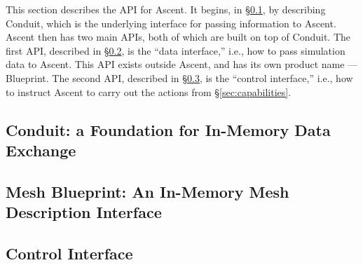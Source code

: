 This section describes the API for Ascent.
%
It begins, in \S\ref{Conduit}, by describing Conduit, which is the underlying
interface for passing information to Ascent.
%
Ascent then has two main APIs, both of which are built on top of Conduit.
%
%
The first API, described in \S\ref{Blueprint}, is the ``data interface,'' i.e., how
to pass simulation data to Ascent.
%
This API exists outside Ascent, and has its own product name --- Blueprint.
%
The second API, described in \S\ref{ascent_control}, is the ``control interface,''
i.e., how to instruct Ascent to carry out the actions from \S\ref{sec:capabilities}.

\subsection{Conduit: a Foundation for In-Memory Data Exchange}
\label{Conduit}


\subsection{Mesh Blueprint: An In-Memory Mesh Description Interface}
\label{Blueprint}


\subsection{Control Interface}
\label{ascent_control}


